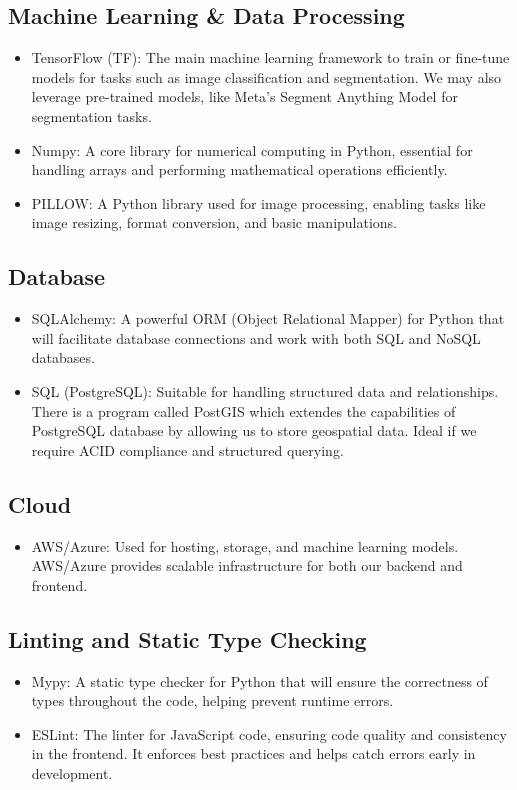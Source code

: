 \documentclass{article}
\begin{document}
  \subsection{Machine Learning \& Data Processing}
  \begin{itemize}
      \item TensorFlow (TF): The main machine learning framework to train or fine-tune models for tasks such as image classification and segmentation. We may also leverage pre-trained models, like Meta’s Segment Anything Model for segmentation tasks.
      \item Numpy: A core library for numerical computing in Python, essential for handling arrays and performing mathematical operations efficiently.
      \item PILLOW: A Python library used for image processing, enabling tasks like image resizing, format conversion, and basic manipulations.
  \end{itemize}
  
  \subsection{Database}
  \begin{itemize}
      \item SQLAlchemy: A powerful ORM (Object Relational Mapper) for Python that will facilitate database connections and work with both SQL and NoSQL databases.
      \item SQL (PostgreSQL): Suitable for handling structured data and relationships. There is a program called PostGIS which extendes the capabilities of PostgreSQL database by allowing us to store geospatial data. Ideal if we require ACID compliance and structured querying.
  \end{itemize}
  
  \subsection{Cloud}
  \begin{itemize}
      \item AWS/Azure: Used for hosting, storage, and machine learning models. AWS/Azure provides scalable infrastructure for both our backend and frontend.
 \end{itemize}
  \subsection{Linting and Static Type Checking}
  \begin{itemize}
    \item Mypy: A static type checker for Python that will ensure the correctness of types throughout the code, helping prevent runtime errors.
    \item ESLint: The linter for JavaScript code, ensuring code quality and consistency in the frontend. It enforces best practices and helps catch errors early in development.
  \end{itemize}
\end{document}
